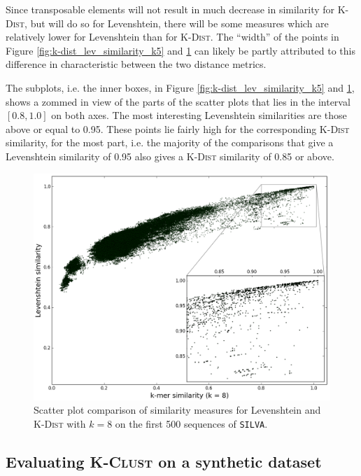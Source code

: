Since transposable elements will not result in much decrease in similarity for
\textsc{K-Dist}, but will do so for Levenshtein, there will be some measures
which are relatively lower for Levenshtein than for \textsc{K-Dist}. The
``width'' of the points in Figure \ref{fig:k-dist_lev_similarity_k5} and
\ref{fig:k-dist_lev_similarity_k8} can likely be partly attributed to this
difference in characteristic between the two distance metrics.

The subplots, i.e. the inner boxes, in Figure
\ref{fig:k-dist_lev_similarity_k5} and \ref{fig:k-dist_lev_similarity_k8},
shows a zommed in view of the parts of the scatter plots that lies in the
interval $[0.8,1.0]$ on both axes. The most interesting Levenshtein
similarities are those above or equal to 0.95. These points lie fairly high for
the corresponding \textsc{K-Dist} similarity, for the most part, i.e. the
majority of the comparisons that give a Levenshtein similarity of 0.95 also
gives a \textsc{K-Dist} similarity of 0.85 or above.

\begin{figure}[H]
  \includegraphics[width=1.0\textwidth]{graphics/Levenshtein_K-Dist_k8.png}
  \caption{Scatter plot comparison of similarity measures for Levenshtein and
    \textsc{K-Dist} with $k=8$ on the first 500 sequences of \texttt{SILVA}.}
  \label{fig:k-dist_lev_similarity_k8}
\end{figure}


\subsection{Evaluating \textsc{K-Clust} on a synthetic dataset}
\label{sec:synth_dataset}

